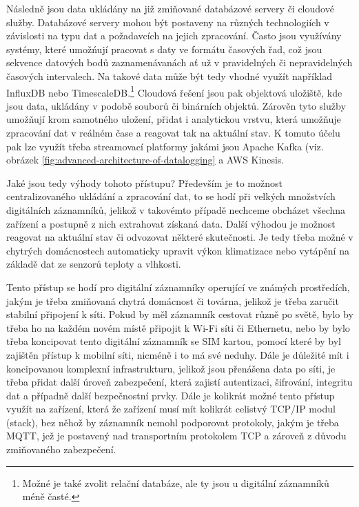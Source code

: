 Následně jsou data ukládány na již zmiňované databázové servery či cloudové služby. Databázové servery mohou být postaveny na různých technologiích v závislosti na typu dat a požadavcích na jejich zpracování. Často jsou využívány systémy, které umožńují pracovat s daty ve formátu časových řad, což jsou sekvence datových bodů zaznamenávanách ať už v pravidelných či nepravidelných časových intervalech. Na takové data může být tedy vhodné využít například InfluxDB nebo TimescaleDB.\footnote{Možné je také zvolit relační databáze, ale ty jsou u digitální záznamníků méně časté.} Cloudová řešení jsou pak objektová uložiště, kde jsou data, ukládány v podobě souborů či binárních objektů. Zárověn tyto služby umožňují krom samotného uložení, přidat i analytickou vrstvu, která umožňuje zpracování dat v reálném čase a reagovat tak na aktuální stav. K tomuto účelu pak lze využít třeba streamovací platformy jakámi jsou  Apache Kafka (viz. obrázek \ref{fig:advanced-architecture-of-datalogging} a AWS Kinesis. \cite{springer_analysis_time_series_db_edge_computing}

Jaké jsou tedy výhody tohoto přístupu? Především je to možnost centralizovaného ukládání a zpracování dat, to se hodí při velkých množstvích digitálních záznamníků, jelikož v takovémto případě nechceme obcházet všechna zařízení a postupně z nich extrahovat získaná data. Další výhodou je možnost reagovat na aktuální stav či odvozovat některé skutečnosti. Je tedy třeba možné v chytrých domácnostech automaticky upravit výkon klimatizace nebo vytápění na základě dat ze senzorů teploty a vlhkosti. \cite{springer_analysis_time_series_db_edge_computing}

Tento přístup se hodí pro digitální záznamníky operující ve známých prostředích, jakým je třeba zmiňovaná chytrá domácnost či továrna, jelikož je třeba zaručit stabilní připojení k síti. Pokud by měl záznamník cestovat různě po světě, bylo by třeba ho na každém novém místě připojit k Wi-Fi síti či Ethernetu, nebo by bylo třeba koncipovat tento digitální záznamník se SIM kartou, pomocí které by byl zajištěn přístup k mobilní síti, nicméně i to má své neduhy. Dále je důležité mít i koncipovanou komplexní infrastrukturu, jelikož jsou přenášena data po síti, je třeba přidat další úroveň zabezpečení, která zajistí autentizaci, šifrování, integritu dat a případně další bezpečnostní prvky. Dále je kolikrát možné tento přístup využít na zařízení, která že zařízení musí mít kolikrát celistvý TCP/IP modul (stack), bez něhož by záznamník nemohl podporovat protokoly, jakým je třeba MQTT, jež je postavený nad transportním protokolem TCP a zároveň z důvodu zmiňovaného zabezpečení.


